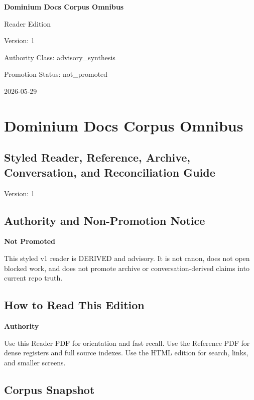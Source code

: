 \documentclass[10.5pt,a4paper,openany]{book}
\newcommand{\vonecallout}[3]{\par\medskip\noindent\begingroup\setlength{\fboxsep}{7pt}\colorbox{DomCalloutBg}{\parbox{0.94\linewidth}{\textbf{\textcolor{#1}{#2}}\par #3}}\endgroup\par\medskip}
\begin{document}
\frontmatter
\begin{titlepage}
\centering
\vspace*{1.8cm}
{\Huge\bfseries Dominium Docs Corpus Omnibus\par}
\vspace{0.7cm}
{\Large Reader Edition\par}
\vspace{1.1cm}
{\large Version: 1\par}
{\large Authority Class: advisory\_synthesis\par}
{\large Promotion Status: not\_promoted\par}
\vfill
{\large 2026-05-29\par}
\end{titlepage}
\tableofcontents
\mainmatter
\chapter{Dominium Docs Corpus Omnibus}

\section{Styled Reader, Reference, Archive, Conversation, and Reconciliation Guide}

Version: 1




\section{Authority and Non-Promotion Notice}

\vonecallout{DomGreen}{Not Promoted}{This styled v1 reader is DERIVED and advisory.\allowbreak{} It is not canon, does not open blocked work, and does not promote archive or conversation-\allowbreak{}derived claims into current repo truth.\allowbreak{}}



\section{How to Read This Edition}

\vonecallout{DomBlue}{Authority}{Use this Reader PDF for orientation and fast recall.\allowbreak{} Use the Reference PDF for dense registers and full source indexes.\allowbreak{} Use the HTML edition for search, links, and smaller screens.\allowbreak{}}



\section{Corpus Snapshot}
\end{document}
